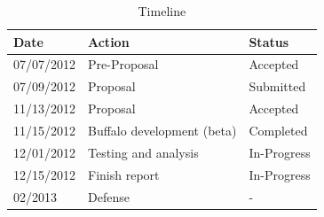 \begin{table}[H]
\centering
\begin{tabular}{|l|l|l|}
\hline
Date & Action & Status\\
\hline
07/07/2012 & Pre-Proposal & Accepted\\
07/09/2012 & Proposal & Submitted\\
11/13/2012 & Proposal & Accepted\\
11/15/2012 & Buffalo development (beta) & Completed \\
12/01/2012 & Testing and analysis&In-Progress\\
12/15/2012 & Finish report & In-Progress \\
02/2013 & Defense & - \\
\hline
\end{tabular}
\caption{Timeline}
\label{tab:roadmap_tbl}
\end{table}


%

\singlespacing




